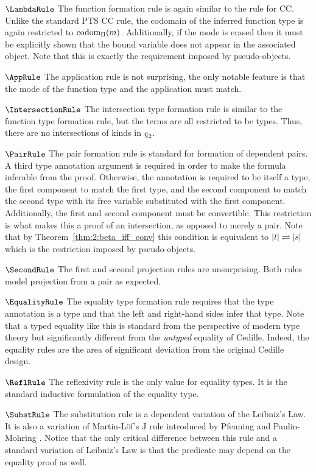 $\LambdaRule$ The function formation rule is again similar to the rule for CC.
Unlike the standard PTS CC rule, the codomain of the inferred function type is again restricted to $\textnormal{codom}_\Pi(m)$.
Additionally, if the mode is erased then it must be explicitly shown that the bound variable does not appear in the associated object.
Note that this is exactly the requirement imposed by pseudo-objects.

$\AppRule$ The application rule is not surprising, the only notable feature is that the mode of the function type and the application must match.

$\IntersectionRule$ The intersection type formation rule is similar to the function type formation rule, but the terms are all restricted to be types.
Thus, there are no intersections of kinds in $\ced$.

$\PairRule$ The pair formation rule is standard for formation of dependent pairs.
A third type annotation argument is required in order to make the formula inferable from the proof.
Otherwise, the annotation is required to be itself a type, the first component to match the first type, and the second component to match the second type with its free variable substituted with the first component.
Additionally, the first and second component must be convertible.
This restriction is what makes this a proof of an intersection, as opposed to merely a pair.
Note that by Theorem~\ref{thm:2:beta_iff_conv} this condition is equivalent to $|t| \rightleftharpoons |s|$ which is the restriction imposed by pseudo-objects.

$\SecondRule$ The first and second projection rules are unsurprising.
Both rules model projection from a pair as expected.

$\EqualityRule$ The equality type formation rule requires that the type annotation is a type and that the left and right-hand sides infer that type.
Note that a typed equality like this is standard from the perspective of modern type theory but significantly different from the \textit{untyped} equality of Cedille.
Indeed, the equality rules are the area of significant deviation from the original Cedille design.



$\ReflRule$ The reflexivity rule is the only value for equality types.
It is the standard inductive formulation of the equality type.

$\SubstRule$ The substitution rule is a dependent variation of the Leibniz's Law.
It is also a variation of Martin-L\"{o}f's J rule introduced by Pfenning and Paulin-Mohring \cite{pfenning1990_subst}.
Notice that the only critical difference between this rule and a standard variation of Leibniz's Law is that the predicate may depend on the equality proof as well.

